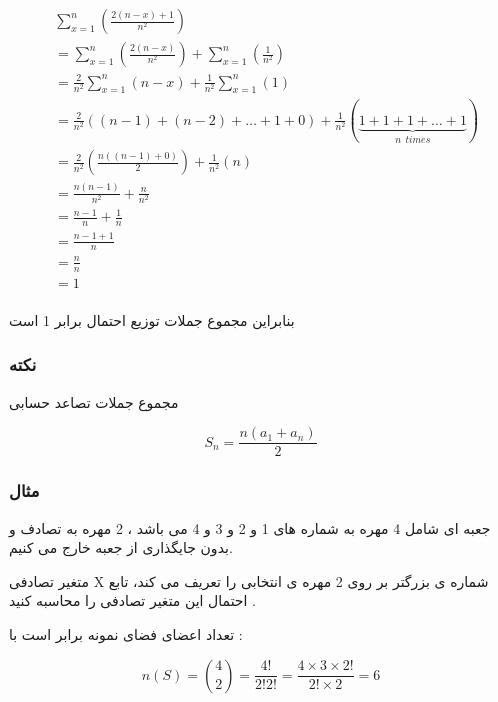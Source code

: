 \documentclass[12pt]{book}
\begin{document}
\begin{align*}
&\sum_{x=1}^{n}{(\frac{2(n-x)+1}{n^{2}})} \\
&= \sum_{x=1}^{n}{(\frac{2(n-x)}{n^{2}})} + \sum_{x=1}^{n}{(\frac{1}{n^{2}})} \\
&= \frac{2}{n^{2}}  \sum_{x=1}^{n}{(n-x)} + \frac{1}{n^{2}}  \sum_{x=1}^{n}{(1)}  \\
&= \frac{2}{n^{2}} ( (n-1) + (n-2) + \dots + 1 + 0 ) +
\frac{1}{n^{2}} ( \underbrace{1 + 1 + 1 + \dots + 1}_{n \:\: times} ) \\
&= \frac{2}{n^{2}} (\frac{n( ( n - 1 ) + 0 )}{2}) + \frac{1}{n^{2}} ( n ) \\
&= \frac{n( n - 1 )}{n^{2}} + \frac{n}{n^{2}} \\
&= \frac{ n - 1 }{n} + \frac{1}{n} \\
&= \frac{ n - 1 + 1 }{n} \\
&= \frac{ n }{n}  \\
&= 1 \\
\end{align*}


بنابراین مجموع جملات توزیع احتمال برابر 1 است 

\subsubsection{نکته}
مجموع جملات تصاعد حسابی

$$
S_{n} = \frac{n(a_{1} + a_{n})}{2}
$$



\subsubsection{مثال}
جعبه ای شامل 4 مهره به شماره های 1 و 2 و 3 و 4 می باشد ، 2 مهره به تصادف و بدون جایگذاری از جعبه خارج می کنیم.

متغیر تصادفی X شماره ی بزرگتر بر روی 2 مهره ی انتخابی را تعریف می کند، تابع احتمال این متغیر تصادفی را محاسبه کنید .



تعداد اعضای فضای نمونه برابر است با :

$$
n(S) = \binom{4}{2} = \frac{4!}{2!2!} = \frac{4 \times 3 \times 2!}{2! \times 2} = 6
$$
\end{document}
